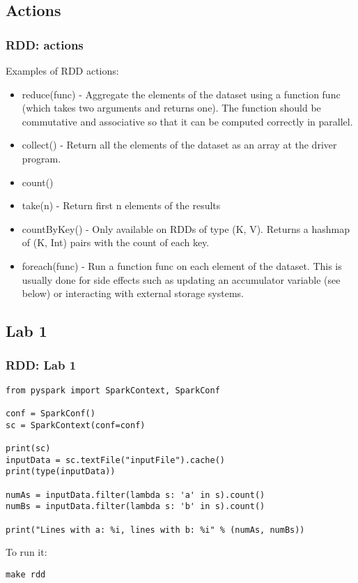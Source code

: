 \subsection{Actions}
\begin{frame}[fragile]
  \frametitle{RDD: actions}
  Examples of RDD actions:
  \begin{itemize}
  \item {\color{mycolorcode}reduce(func)} - Aggregate the elements of the dataset using a function func (which takes two arguments and returns one). 
    The function should be commutative and associative so that it can be computed correctly in parallel.
  \item {\color{mycolorcode}collect()} - Return all the elements of the dataset as an array at the driver program.
  \item {\color{mycolorcode}count()}
  \item {\color{mycolorcode}take(n)} - Return first n elements of the results
  \item {\color{mycolorcode}countByKey()} - Only available on RDDs of type (K, V). Returns a hashmap of (K, Int) pairs with the count of each key.
  \item {\color{mycolorcode}foreach(func)} - Run a function func on each element of the dataset. 
    This is usually done for side effects such as updating an accumulator variable (see below) or interacting with external storage systems.
  \end{itemize}
\end{frame}


\subsection{Lab 1}
\begin{frame}[fragile]
  \frametitle{RDD: Lab 1}
{\color{mycolorcode}
\begin{verbatim}
from pyspark import SparkContext, SparkConf

conf = SparkConf()
sc = SparkContext(conf=conf)

print(sc)
inputData = sc.textFile("inputFile").cache()
print(type(inputData))

numAs = inputData.filter(lambda s: 'a' in s).count()
numBs = inputData.filter(lambda s: 'b' in s).count()

print("Lines with a: %i, lines with b: %i" % (numAs, numBs))
\end{verbatim}
}

To run it:
{\color{mycolorcli}
\begin{verbatim}
make rdd
\end{verbatim}
}

\end{frame}


